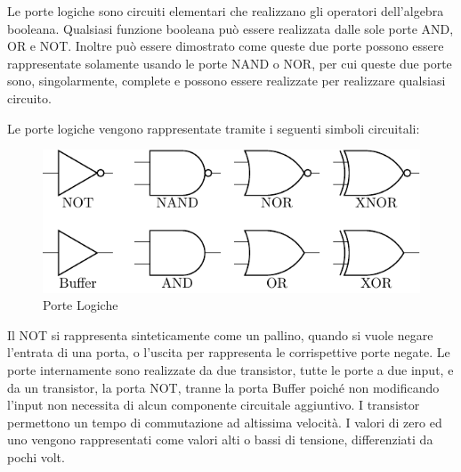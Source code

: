 \documentclass{article}
\numberwithin{equation}{subsection}
\begin{document}
Le porte logiche sono circuiti elementari che realizzano gli operatori dell'algebra booleana. Qualsiasi funzione booleana può essere realizzata dalle sole porte AND, OR e NOT. Inoltre può essere dimostrato come queste 
due porte possono essere rappresentate solamente usando le porte NAND o NOR, per cui queste due porte sono, singolarmente, complete e possono essere realizzate per realizzare qualsiasi circuito. 

Le porte logiche vengono rappresentate tramite i seguenti simboli circuitali:
\begin{figure}[H]%
    \centering
    \includegraphics{porte-logiche.pdf}%
    \caption{Porte Logiche}%
\end{figure}
Il NOT si rappresenta sinteticamente come un pallino, quando si vuole negare l'entrata di una porta, o l'uscita per rappresenta le corrispettive porte negate. 
Le porte internamente sono realizzate da due transistor, tutte le porte a due input, e da un transistor, la porta NOT, tranne la porta Buffer poiché non modificando l'input non necessita di alcun componente circuitale 
aggiuntivo. I transistor permettono un tempo di commutazione ad altissima velocità. I valori di zero ed uno vengono rappresentati come valori alti o bassi di tensione, differenziati da pochi volt. 
\end{document}
